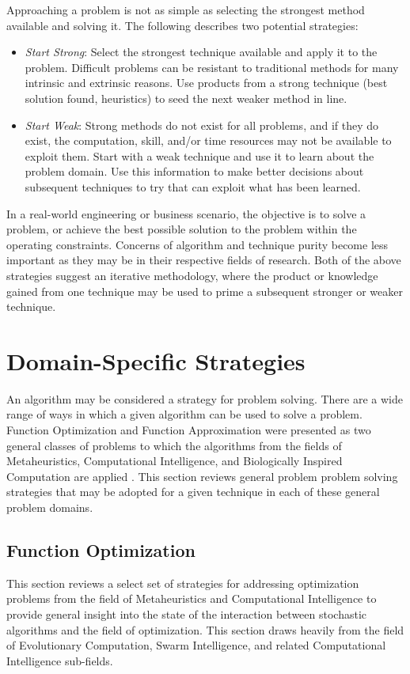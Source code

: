 \documentclass[a4paper, 11pt]{article}
\begin{document}
Approaching a problem is not as simple as selecting the strongest method available and solving it. The following describes two potential strategies:

\begin{itemize}
  \item \emph{Start Strong}: Select the strongest technique available and apply it to the problem. Difficult problems can be resistant to traditional methods for many intrinsic and extrinsic reasons. Use products from a strong technique (best solution found, heuristics) to seed the next weaker method in line. 
  \item \emph{Start Weak}: Strong methods do not exist for all problems, and if they do exist, the computation, skill, and/or time resources may not be available to exploit them. Start with a weak technique and use it to learn about the problem domain. Use this information to make better decisions about subsequent techniques to try that can exploit what has been learned.
\end{itemize}

In a real-world engineering or business scenario, the objective is to solve a problem, or achieve the best possible solution to the problem within the operating constraints.
Concerns of algorithm and technique purity become less important as they may be in their respective fields of research.
Both of the above strategies suggest an iterative methodology, where the product or knowledge gained from one technique may be used to prime a subsequent stronger or weaker technique. 

%
%
\section{Domain-Specific Strategies}
\label{sec:strategies}
An algorithm may be considered a strategy for problem solving. There are a wide range of ways in which a given algorithm can be used to solve a problem. 
Function Optimization and Function Approximation were presented as two general classes of problems to which the algorithms from the fields of Metaheuristics, Computational Intelligence, and Biologically Inspired Computation are applied \cite{Brownlee2010n}. 
This section reviews general problem problem solving strategies that may be adopted for a given technique in each of these general problem domains.

%
%
\subsection{Function Optimization}
This section reviews a select set of strategies for addressing optimization problems from the field of Metaheuristics and Computational Intelligence to provide general insight into the state of the interaction between stochastic algorithms and the field of optimization. This section draws heavily from the field of Evolutionary Computation, Swarm Intelligence, and related Computational Intelligence sub-fields.
	
\end{document}
